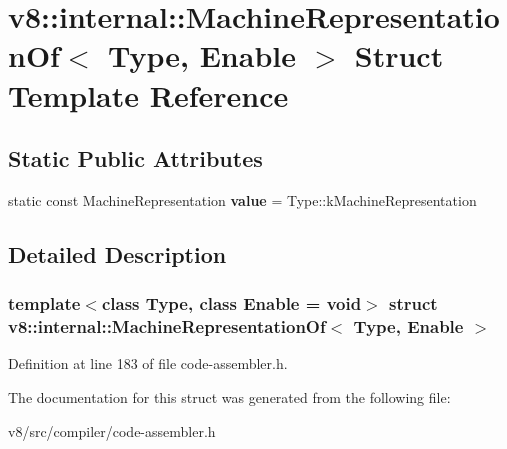 \hypertarget{structv8_1_1internal_1_1MachineRepresentationOf}{}\section{v8\+:\+:internal\+:\+:Machine\+Representation\+Of$<$ Type, Enable $>$ Struct Template Reference}
\label{structv8_1_1internal_1_1MachineRepresentationOf}
\subsection*{Static Public Attributes}
\begin{DoxyCompactItemize}
\item 
\mbox{\label{structv8_1_1internal_1_1MachineRepresentationOf_a58818746924ec28797180748313d2d8e}} 
static const Machine\+Representation {\bfseries value} = Type\+::k\+Machine\+Representation
\end{DoxyCompactItemize}


\subsection{Detailed Description}
\subsubsection*{template$<$class Type, class Enable = void$>$\newline
struct v8\+::internal\+::\+Machine\+Representation\+Of$<$ Type, Enable $>$}



Definition at line 183 of file code-\/assembler.\+h.



The documentation for this struct was generated from the following file\+:\begin{DoxyCompactItemize}
\item 
v8/src/compiler/code-\/assembler.\+h\end{DoxyCompactItemize}
